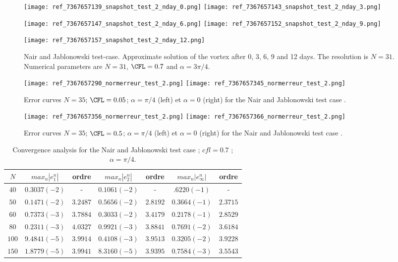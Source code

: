 \begin{figure}[ht!]
\texttt{[image: ref\_7367657139\_snapshot\_test\_2\_nday\_0.png]}
\texttt{[image: ref\_7367657143\_snapshot\_test\_2\_nday\_3.png]}

\texttt{[image: ref\_7367657147\_snapshot\_test\_2\_nday\_6.png]}
\texttt{[image: ref\_7367657152\_snapshot\_test\_2\_nday\_9.png]}

\texttt{[image: ref\_7367657157\_snapshot\_test\_2\_nday\_12.png]}
\caption{Nair and Jablonowski test-case. Approximate solution of the vortex after 
0, 3, 6, 9 and 12 days. The resolution is $N=31$. Numerical parameters are 
$N=31$, $\CFL = 0.7$ and $\alpha = 3 \pi / 4$.}
\label{SNAPSHOT_NJ}
\end{figure}

\begin{figure}[ht!]
\texttt{[image: ref\_7367657290\_normerreur\_test\_2.png]}
\texttt{[image: ref\_7367657345\_normerreur\_test\_2.png]}
\label{erreur_cfl=0.05a}
\caption{Error curves $N=35$; $\CFL=0.05$; $\alpha = \pi / 4$ (left) et $\alpha = 0$ (right) for the Nair and Jablonowski test case \cite{Nair-Jablonowski}.}
\end{figure}

\begin{figure}[ht!]
\texttt{[image: ref\_7367657356\_normerreur\_test\_2.png]}
\texttt{[image: ref\_7367657366\_normerreur\_test\_2.png]}
\label{erreur_cfl=0.5a}
\caption{Error curves $N=35$; $\CFL=0.5$; $\alpha = \pi / 4$ (left) et $\alpha = 0$ (right) for the Nair and Jablonowski test case \cite{Nair-Jablonowski}.}
\end{figure}

\begin{table}[ht!]
\begin{tabular}{|c||cc|cc|cc|}
\hline
$N$ & $max_n |e_1^n|$ & ordre  & $max_n |e_2^n|$ & ordre  & $max_n |e_{\infty}^n|$ & ordre \\
\hline
\hline
$40$ & $0.3037 (-2)$ & -  & $0.1061(-2)$ & - & $.6220 (-1)$  & - \\
\hline 
$50$ & $0.1471 (-2)$ & $3.2487$ & $0.5656(-2)$ & $2.8192$ & $0.3664 (-1)$ & $2.3715$ \\
\hline
$60$ & $0.7373(-3)$ & $3.7884$ & $0.3033(-2)$ & $3.4179$ & $0.2178(-1)$ & $2.8529$ \\
\hline
$80$ & $0.2311(-3) $ & $4.0327$ & $0.9921(-3)$ & $3.8841$ & $0.7691(-2)$ & $3.6184$ \\
\hline
$100$ & $9.4841(-5)$ & $3.9914$ & $0.4108(-3)$ & $3.9513$ & $0.3205(-2)$ & $3.9228$\\
\hline
$150$ & $1.8779 (-5)$ & $3.9941$ & $8.3160 (-5)$ & $3.9395$ & $0.7584(-3)$ & $3.5543$\\
\hline
\end{tabular}
\label{table:2}
\caption{Convergence analysis for the Nair and Jablonowski test case \cite{Nair-Jablonowski} ; $cfl = 0.7$ ; $\alpha = \pi /4$.}
\end{table}

